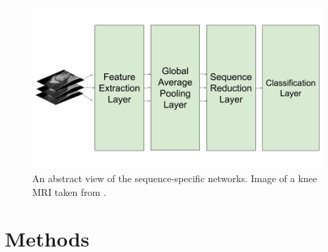 \documentclass[10pt,twocolumn,letterpaper]{article}
\begin{document}
\begin{figure}
\begin{center}
\includegraphics[width=0.6\linewidth]{../images/diagram/network2.png}
\end{center}
   \caption{An abstract view of the sequence-specific networks. Image of a knee MRI taken from \cite{knee-image}.}
\label{fig:network}
\end{figure}

\section{Methods} %

\end{document}
